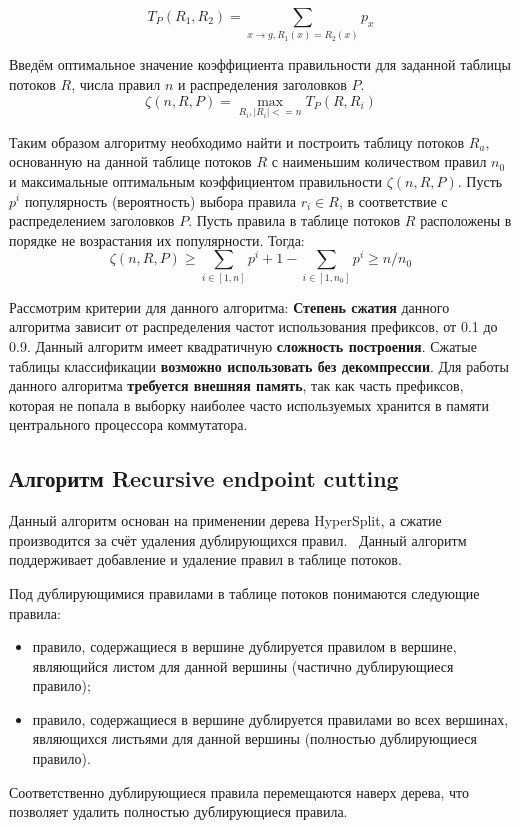 \documentclass[a4paper, 12pt, titlepage, finall]{extreport}
\begin{document}
            \[T_P(R_1, R_2) = \sum_{x \rightarrow g, R_1(x) = R_2(x)} p_x\]

            Введём оптимальное значение коэффициента правильности для заданной таблицы потоков \(R\), числа правил \(n\) и распределения заголовков \(P\).
            \[\zeta(n, R, P) = \max_{R_i, |R_i| <= n} T_P(R, R_i)\]
            
            Таким образом алгоритму необходимо найти и построить таблицу потоков \(R_a\), основанную на данной таблице потоков \(R\)
            с наименьшим количеством правил \(n_0\) и максимальные оптимальным коэффициентом правильности \(\zeta(n, R, P)\).
            Пусть \(p^i\) популярность (вероятность) выбора правила \(r_i \in R\), в соответствие с распределением заголовков \(P\). Пусть
            правила в таблице потоков \(R\) расположены в порядке не возрастания их популярности. Тогда:
            \[\zeta(n, R, P) \geq \sum_{i \in [1, n]} p^i + 1 - \sum_{i \in [1, n_0]} p^i \geq n/n_0\]

            Рассмотрим критерии для данного алгоритма: \textbf{Степень сжатия} данного алгоритма зависит от распределения частот использования префиксов, от 0.1 до 0.9.
            Данный алгоритм имеет квадратичную \textbf{сложность построения}. Сжатые таблицы классификации \textbf{возможно использовать без декомпрессии}.
            Для работы данного алгоритма \textbf{требуется внешняя память}, так как часть префиксов, которая не попала в выборку наиболее часто используемых хранится в
            памяти центрального процессора коммутатора.
        \subsection{Алгоритм Recursive endpoint cutting}
            Данный алгоритм основан на применении дерева HyperSplit, а сжатие производится за счёт удаления дублирующихся правил.~\cite{chang2019fast}
            Данный алгоритм поддерживает добавление и удаление правил в таблице потоков.

            Под дублирующимися правилами в таблице потоков понимаются следующие правила:
            \begin{itemize}
                \item правило, содержащиеся в вершине дублируется правилом в вершине, являющийся листом для данной вершины (частично дублирующиеся правило);
                \item правило, содержащиеся в вершине дублируется правилами во всех вершинах, являющихся листьями для данной вершины (полностью дублирующиеся правило).
            \end{itemize}
            Соответственно дублирующиеся правила перемещаются наверх дерева, что позволяет удалить полностью дублирующиеся правила.
            
\end{document}
